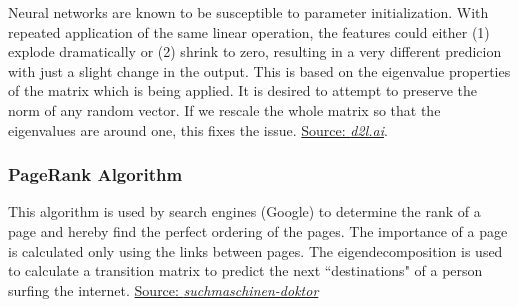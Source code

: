 \documentclass{article}
\begin{document}
Neural networks are known to be susceptible to parameter initialization. With repeated application of the same linear operation, the features could either (1) explode dramatically or (2) shrink to zero, resulting in a very different predicion with just a slight change in the output. This is based on the eigenvalue properties of the matrix which is being applied. It is desired to attempt to preserve the norm of any random vector. If we rescale the whole matrix so that the eigenvalues are around one, this fixes the issue. \href{http://www.d2l.ai/chapter\_appendix-mathematics-for-deep-learning/eigendecomposition.html}{Source: \emph{d2l.ai}}.

\subsubsection{PageRank Algorithm}

This algorithm is used by search engines (Google) to determine the rank of a page and hereby find the perfect ordering of the pages. The importance of a page is calculated only using the links between pages. The eigendecomposition is used to calculate a transition matrix to predict the next ``destinations" of a person surfing the internet. \href{http://www.suchmaschinen-doktor.de/algorithmen/pagerank.html}{Source: \emph{suchmaschinen-doktor}}
\end{document}
